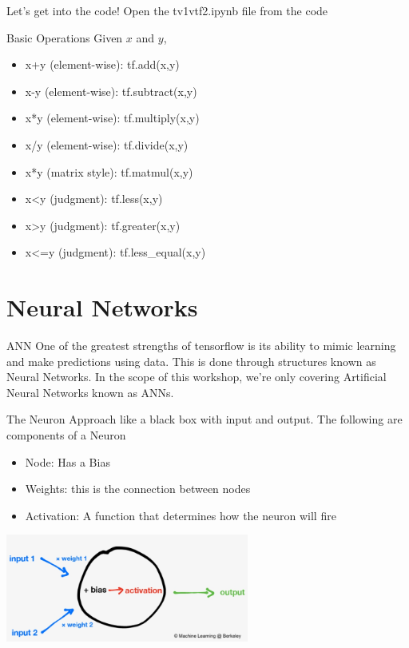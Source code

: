 \documentclass{beamer}
\begin{document}
\begin{frame}[fragile]{Let's get into the code!}
Open the tv1vtf2.ipynb file from the code
\end{frame}

\begin{frame}[fragile]{Basic Operations}
Given $x$ and $y$,
\begin{itemize}
	\item x+y (element-wise): tf.add(x,y)
	\item x-y (element-wise): tf.subtract(x,y)
	\item x*y (element-wise): tf.multiply(x,y)
	\item x/y (element-wise): tf.divide(x,y)
	\item x*y (matrix style): tf.matmul(x,y)
	\item x<y (judgment): tf.less(x,y)
	\item x>y (judgment): tf.greater(x,y)
	\item x<=y (judgment): tf.less\_equal(x,y)
\end{itemize}
\end{frame}


\section{Neural Networks}

\begin{frame}[fragile]{ANN}
One of the greatest strengths of tensorflow is its ability to mimic learning and make predictions using data. This is done through structures known as Neural Networks. In the scope of this workshop, we're only covering Artificial Neural Networks known as ANNs.
\end{frame}

\begin{frame}[fragile]{The Neuron}
Approach like a black box with input and output. The following are components of a Neuron
\begin{itemize}
	\item Node: Has a Bias
	\item Weights: this is the connection between nodes
	\item Activation: A function that determines how the neuron will fire
\end{itemize}
\begin{center}
{\includegraphics[width=8cm]{images/neuron.jpg}}
\end{center}
\end{frame}
\end{document}
